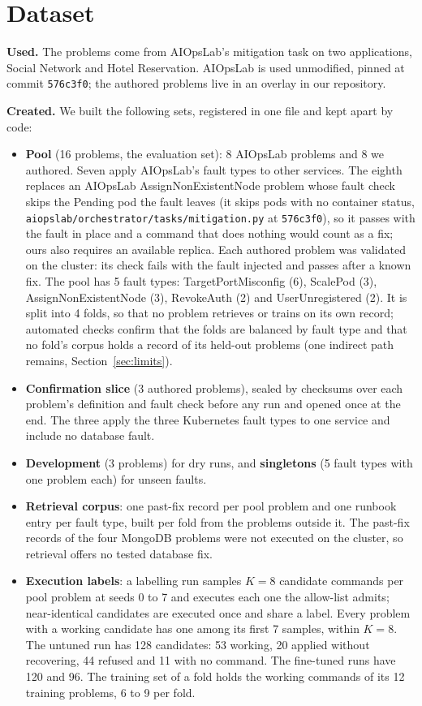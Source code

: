 \documentclass[10pt,conference]{IEEEtran}
\newcommand{\code}[1]{\texttt{\upshape #1}}
\begin{document}
\section{Dataset}
\label{sec:data}

\textbf{Used.} The problems come from AIOpsLab's mitigation task on two applications, Social
Network and Hotel Reservation. AIOpsLab is used unmodified, pinned at commit \code{576c3f0}; the
authored problems live in an overlay in our repository.

\textbf{Created.} We built the following sets, registered in one file and kept apart by code:
\begin{itemize}
\item \textbf{Pool} (16 problems, the evaluation set): 8 AIOpsLab problems and 8 we authored. Seven
apply AIOpsLab's fault types to other services. The eighth replaces an AIOpsLab AssignNonExistentNode
problem whose fault check skips the Pending pod the fault leaves (it skips pods with no container
status, \nolinkurl{aiopslab/orchestrator/tasks/mitigation.py} at \code{576c3f0}), so it passes with the fault in
place and a command that does nothing would count as a fix; ours also requires an available
replica. Each authored problem was validated on the cluster: its check fails with the fault
injected and passes after a known fix. The pool has 5 fault types: TargetPortMisconfig (6),
ScalePod (3), AssignNonExistentNode (3), RevokeAuth (2) and UserUnregistered (2). It is split into
4 folds, so that no problem retrieves or trains on its own record; automated checks confirm that
the folds are balanced by fault type and that no fold's corpus holds a record of its held-out
problems (one indirect path remains, Section~\ref{sec:limits}).
\item \textbf{Confirmation slice} (3 authored problems), sealed by checksums over each problem's
definition and fault check before any run and opened once at the end. The three apply the three
Kubernetes fault types to one service and include no database fault.
\item \textbf{Development} (3 problems) for dry runs, and \textbf{singletons} (5 fault types with
one problem each) for unseen faults.
\item \textbf{Retrieval corpus}: one past-fix record per pool problem and one runbook entry per
fault type, built per fold from the problems outside it. The past-fix records of the four MongoDB
problems were not executed on the cluster, so retrieval offers no tested database fix.
\item \textbf{Execution labels}: a labelling run samples $K=8$ candidate commands per pool problem
at seeds 0 to 7 and executes each one the allow-list admits; near-identical candidates are executed
once and share a label. Every problem with a working candidate has one among its first 7 samples,
within $K=8$. The untuned run has 128 candidates: 53 working, 20 applied without recovering,
44 refused and 11 with no command. The fine-tuned runs have 120 and 96. The training set of a fold
holds the working commands of its 12 training problems, 6 to 9 per fold.
\end{itemize}
\end{document}
